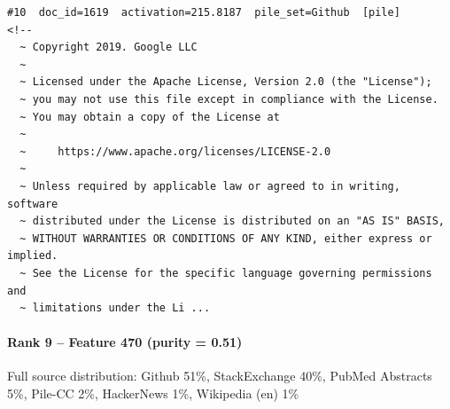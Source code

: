 \begin{verbatim}
#10  doc_id=1619  activation=215.8187  pile_set=Github  [pile]
<!--
  ~ Copyright 2019. Google LLC
  ~
  ~ Licensed under the Apache License, Version 2.0 (the "License");
  ~ you may not use this file except in compliance with the License.
  ~ You may obtain a copy of the License at
  ~
  ~     https://www.apache.org/licenses/LICENSE-2.0
  ~
  ~ Unless required by applicable law or agreed to in writing, software
  ~ distributed under the License is distributed on an "AS IS" BASIS,
  ~ WITHOUT WARRANTIES OR CONDITIONS OF ANY KIND, either express or implied.
  ~ See the License for the specific language governing permissions and
  ~ limitations under the Li ...

\end{verbatim}

\paragraph*{Rank 9 -- Feature 470 (purity = 0.51)}

Full source distribution: Github 51\%, StackExchange 40\%, PubMed Abstracts 5\%, Pile-CC 2\%, HackerNews 1\%, Wikipedia (en) 1\%

